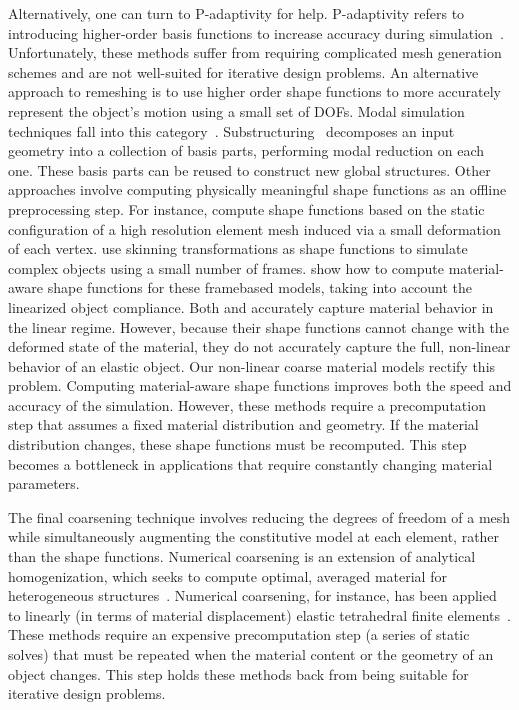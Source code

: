 Alternatively, one can turn to P-adaptivity for help.
P-adaptivity refers to introducing higher-order basis functions 
to increase accuracy during simulation~\citep{Szabo2004}.
Unfortunately, these methods suffer from requiring complicated mesh generation schemes and are not
well-suited for iterative design problems.
An alternative approach to remeshing is to use higher order shape
functions to more accurately represent the object's motion
using a small set of DOFs. Modal simulation techniques fall into
this category~\citep{Shabana1991,Krysl2001,Barbic:subspace:2005}.
Substructuring~\citep{Barbic2011} decomposes an input
geometry into a collection of basis parts, performing modal reduction on each one.
These basis parts can be reused to construct new global structures.
Other approaches involve computing physically meaningful shape functions as an
offline preprocessing step.
For instance, \citet{Nesme2009} compute shape functions based on
the static configuration of a high resolution element mesh induced
via a small deformation of each vertex.
\citet{Faure2011} use skinning transformations as shape functions to simulate complex
objects using a small number of frames.
\citet{Gilles2011} show how to compute material-aware shape functions for these framebased
models, taking into account the linearized object compliance.
Both \citet{Nesme2009} and \citet{Faure2011} accurately capture
material behavior in the linear regime.
However, because their shape functions cannot change with the deformed state of the material,
they do not accurately capture the full, non-linear behavior of an elastic object.
Our non-linear coarse material models rectify this problem.
Computing material-aware shape functions improves both the speed
and accuracy of the simulation. However, these methods require a
precomputation step that assumes a fixed material distribution and geometry.
If the material distribution changes, these shape functions
must be recomputed. This step becomes a bottleneck in applications
that require constantly changing material parameters.

The final coarsening technique involves reducing the degrees of freedom
of a mesh while simultaneously augmenting the constitutive
model at each element, rather than the shape functions.
Numerical coarsening is an extension of analytical homogenization, which seeks
to compute optimal,
averaged material for heterogeneous structures~\citep{Guedes1990,farmer2002}.
Numerical coarsening, for instance, has been applied to linearly
(in terms of material displacement)
elastic tetrahedral finite elements~\citep{Kharevych2009}.
These methods require an expensive precomputation step (a series
of static solves) that must be repeated when the material content or
the geometry of an object changes.
This step holds these methods back from being suitable for iterative design problems.
